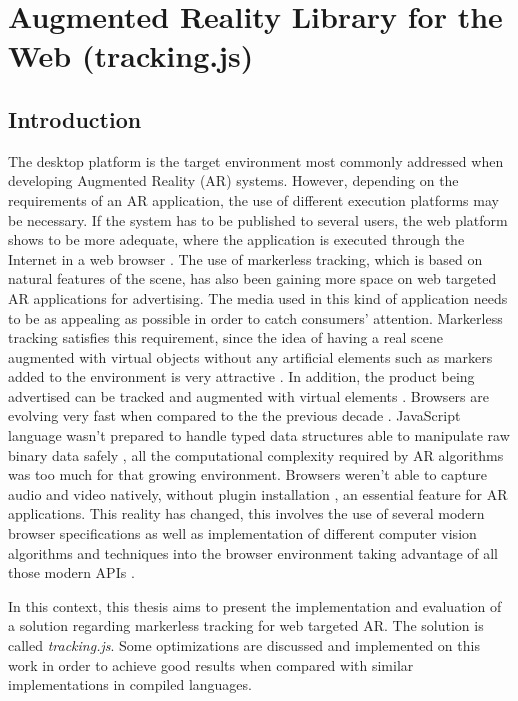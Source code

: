 \chapter{Augmented Reality Library for the Web (tracking.js)} %
\label{cha:ar_library_for_the_web}

\section{Introduction} %
\label{sec:ar_library_for_the_web:introduction}

The desktop platform is the target environment most commonly addressed when developing Augmented Reality (AR) systems. However, depending on the requirements of an AR application, the use of different execution platforms may be necessary. If the system has to be published to several users, the web platform shows to be more adequate, where the application is executed through the Internet in a web browser \cite{Pablo2013}.
The use of markerless tracking, which is based on natural features of the scene, has also been gaining more space on web targeted AR applications for advertising. The media used in this kind of application needs to be as appealing as possible in order to catch consumers’ attention. Markerless tracking satisfies this requirement, since the idea of having a real scene augmented with virtual objects without any artificial elements such as markers added to the environment is very attractive \cite{Pablo2013}. In addition, the product being advertised can be tracked and augmented with virtual elements \cite{Pablo2013}.
Browsers are evolving very fast when compared to the the previous decade \cite{Hickson2013}. JavaScript language \cite{International2009,MDN2013} wasn't prepared to handle typed data structures \cite{TypedArray2013} able to manipulate raw binary data safely \cite{Canvas2013}, all the computational complexity required by AR algorithms was too much for that growing environment. Browsers weren't able to capture audio and video \cite{MediaCapture2013,WebRTC2013} natively, without plugin installation \cite{Flash2013}, an essential feature for AR applications. This reality has changed, this involves the use of several modern browser specifications \cite{Hickson2013,WC2006} as well as implementation of different computer vision algorithms and techniques into the browser environment taking advantage of all those modern APIs \cite{Hickson2013,WC2006}.

In this context, this thesis aims to present the implementation and evaluation of a solution regarding markerless tracking for web targeted AR. The solution is called \textit{tracking.js}. Some optimizations are discussed and implemented on this work in order to achieve good results when compared with similar implementations in compiled languages.

